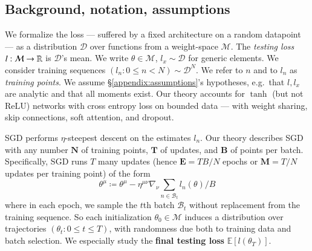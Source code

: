 \documentclass[anon,12pt]{colt2021} %
\newcommand{\expc}{\mathbb{E}}
\newcommand{\Bb}{\mathcal{B}}
\newcommand{\Dd}{\mathcal{D}}
\newcommand{\Mm}{\mathcal{M}}
\begin{document}
        \subsection{Background, notation, assumptions}\label{sect:background}

    
            We formalize the loss --- suffered by a fixed architecture on a
            random datapoint --- as a distribution $\Dd$ over functions from a
            weight-space $\Mm$.  The \emph{testing loss} $l:\Mm\to\RR$ is
            $\Dd$'s mean.  We write $\theta\in\Mm$, $l_x\sim\Dd$ for generic
            elements.
            We consider training sequences $(l_n: 0\leq n<N) \sim \Dd^N$.  We
            refer to $n$ and to $l_n$ as \emph{training points}.  We assume
            \S\ref{appendix:assumptions}'s hypotheses, e.g.\ that $l, l_x$ are
            analytic and that all moments exist.
            Our theory accounts for $\tanh$ (but not $\text{ReLU}$) networks
            with cross entropy loss on bounded data --- with weight
            sharing, skip connections, soft attention, and dropout.  


            SGD performs $\eta$-steepest descent on the estimates $l_n$.  Our
            theory describes SGD with any number
                \colorbox{moolime}{$\mathbf{N}$ of training points},
                \colorbox{moolime}{$\mathbf{T}$ of updates}, and 
                \colorbox{moolime}{$\mathbf{B}$ of points per batch}.
            Specifically, SGD runs $T$ many updates (hence
                \colorbox{moolime}{$\mathbf{E}=TB/N$ epochs} or
                \colorbox{moolime}{$\mathbf{M}=T/N$ updates per training point}) of the form
            $$
                \textstyle
                \theta^\mu
                \coloneqq
                \theta^\mu -
                \eta^{\mu\nu} \nabla_\nu
                    \sum_{n\in \Bb_t} l_n(\theta) / B
            $$
            where in each epoch, we sample the $t$th batch $\Bb_t$ without
            replacement from the training sequence.  So each initialization
            $\theta_0 \in \Mm$ induces a distribution over
            trajectories $(\theta_t: 0\leq t \leq T)$, with randomness due both
            to training data and batch selection.  We especially study
            the \textbf{final testing loss} $\expc[l(\theta_T)]$.
\end{document}
